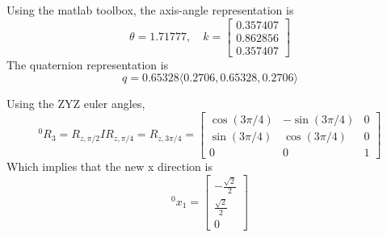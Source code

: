 \documentclass{../homework}
\begin{document}
\begin{problem}
\end{problem}

\begin{solution}
  Using the matlab toolbox, the axis-angle representation is
  \[
    \theta = 1.71777, \quad k =
    \begin{bmatrix}
      0.357407 \\
      0.862856 \\
      0.357407
    \end{bmatrix}
  \]
  The quaternion representation is 
  \[
    q = 0.65328 \langle 0.2706, 0.65328, 0.2706 \rangle
  \]
\end{solution}

\begin{problem}
\end{problem}

\begin{solution}
  Using the ZYZ euler angles,
  \[ ^0R_3 = R_{z,\pi/2}IR_{z,\pi/4} = R_{z, 3 \pi/4} =
  \begin{bmatrix}
  \cos(3\pi/4) & -\sin(3\pi/4) & 0 \\
  \sin(3\pi/4) & \cos(3\pi/4)  & 0 \\
  0     &    0      & 1
  \end{bmatrix}
  \]
  Which implies that the new x direction is
  \[^0x_1 =
  \begin{bmatrix}
    -\frac{\sqrt{2}}{2} \\
    \frac{\sqrt{2}}{2} \\
    0
  \end{bmatrix}\]
\end{solution}
\end{document}
